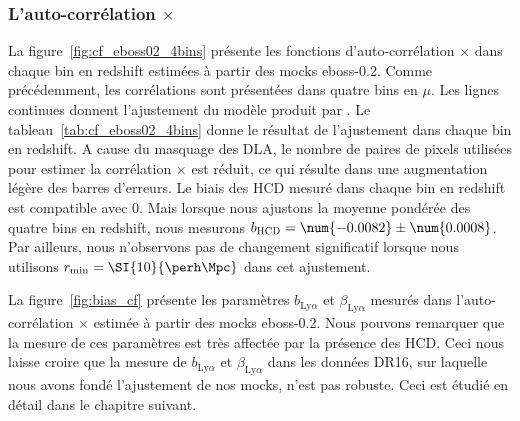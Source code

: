 \subsubsection{L'auto-corrélation \lya{}$\times$\lya{}}
La figure~\ref{fig:cf_eboss02_4bins} présente les fonctions d'auto-corrélation \lya{}$\times$\lya{} dans chaque bin en redshift estimées à partir des mocks eboss-0.2. Comme précédemment, les corrélations sont présentées dans quatre bins en $\mu$.
Les lignes continues donnent l'ajustement du modèle produit par \picca{}.
Le tableau~\ref{tab:cf_eboss02_4bins} donne le résultat de l'ajustement dans chaque bin en redshift.
A cause du masquage des DLA, le nombre de paires de pixels utilisées pour estimer la corrélation \lya{}$\times$\lya{} est réduit, ce qui résulte dans une augmentation légère des barres d'erreurs.
Le biais des HCD mesuré dans chaque bin en redshift est compatible avec 0.
Mais lorsque nous ajustons la moyenne pondérée des quatre bins en redshift, nous mesurons $b_{\textsc{HCD}} = \num{-0.0082} \pm \num{0.0008}$. 
Par ailleurs, nous n'observons pas de changement significatif lorsque nous utilisons $r_{\mathrm{min}} = \SI{10}{\perh\Mpc}$ dans cet ajustement.

La figure~\ref{fig:bias_cf} présente les paramètres  $b_{\mathrm{Ly}\alpha}$ et $\beta_{\mathrm{Ly}\alpha}$ mesurés dans l'auto-corrélation \lya{}$\times$\lya{} estimée à partir des mocks eboss-0.2. Nous pouvons remarquer que la mesure de ces paramètres est très affectée par la présence des HCD. Ceci nous laisse croire que la mesure de $b_{\mathrm{Ly}\alpha}$ et $\beta_{\mathrm{Ly}\alpha}$ dans les données DR16, sur laquelle nous avons fondé l'ajustement de nos mocks, n'est pas robuste. Ceci est étudié en détail dans le chapitre suivant.


